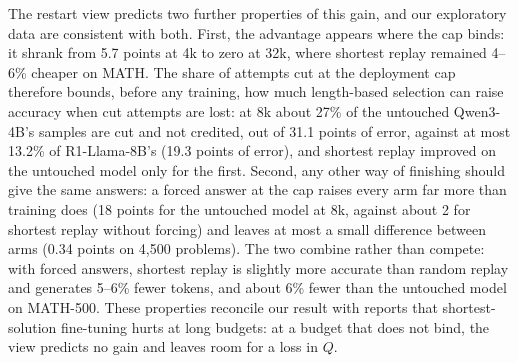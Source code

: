 \documentclass[10pt]{article}
\begin{document}
The restart view predicts two further properties of this gain, and our exploratory data are consistent with both. First, the advantage appears where the cap binds: it shrank from 5.7 points at 4k to zero at 32k, where shortest replay remained 4--6\% cheaper on MATH. The share of attempts cut at the deployment cap therefore bounds, before any training, how much length-based selection can raise accuracy when cut attempts are lost: at 8k about 27\% of the untouched Qwen3-4B's samples are cut and not credited, out of 31.1 points of error, against at most 13.2\% of R1-Llama-8B's (19.3 points of error), and shortest replay improved on the untouched model only for the first. Second, any other way of finishing should give the same answers: a forced answer at the cap raises every arm far more than training does (18 points for the untouched model at 8k, against about 2 for shortest replay without forcing) and leaves at most a small difference between arms (0.34 points on 4{,}500 problems). The two combine rather than compete: with forced answers, shortest replay is slightly more accurate than random replay and generates 5--6\% fewer tokens, and about 6\% fewer than the untouched model on MATH-500. These properties reconcile our result with reports that shortest-solution fine-tuning hurts at long budgets\cite{arora2025training}: at a budget that does not bind, the view predicts no gain and leaves room for a loss in $Q$.
\end{document}
